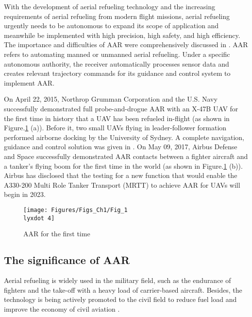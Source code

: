 With the development of aerial refueling technology and the increasing
requirements of aerial refueling from modern flight missions, aerial
refueling urgently needs to be autonomous to expand its scope of application
and meanwhile be implemented with high precision, high safety, and
high efficiency. The importance and difficulties of AAR were comprehensively
discussed in \cite{Nalepka-2005-1}. AAR refers to automating
manned or unmanned aerial refueling. Under a specific autonomous authority,
the receiver automatically processes sensor data and creates relevant
trajectory commands for its guidance and control system to implement
AAR. 

On April 22, 2015, Northrop Grumman Corporation and the U.S. Navy
successfully demonstrated full probe-and-drogue AAR with an X-47B
UAV for the first time in history that a UAV has been refueled in-flight
(as shown in Figure.\ref{Fig_1.4} (a)). Before it, two small UAVs
flying in leader-follower formation performed airborne docking by
the University of Sydney. A complete navigation, guidance and control
solution was given in \cite{wilson2015guidance}. On May 09, 2017,
Airbus Defense and Space successfully demonstrated AAR contacts between
a fighter aircraft and a tanker\textquoteright s flying boom for the
first time in the world (as shown in Figure.\ref{Fig_1.4} (b)). Airbus
has disclosed that the testing for a new function that would enable
the A330-200 Multi Role Tanker Transport (MRTT) to achieve AAR for
UAVs will begin in 2023.

\begin{figure}
\begin{centering}
\texttt{[image: Figures/Figs\_Ch1/Fig\_1\\lyxdot 4]}
\par\end{centering}
\caption{AAR for the first time}

\centering{}\label{Fig_1.4}
\end{figure}


\subsection{The significance of AAR}

Aerial refueling is widely used in the military field, such as the
endurance of fighters and the take-off with a heavy load of carrier-based
aircraft. Besides, the technology is being actively promoted to the
civil field to reduce fuel load and improve the economy of civil aviation
\cite{bennington2005aerial}. 

